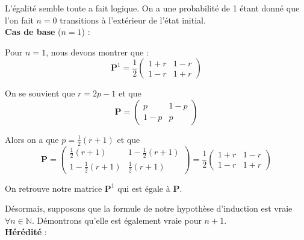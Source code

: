 \documentclass{article}
\begin{document}
    \newpage
    L'égalité semble toute a fait logique. On a une probabilité de 1 étant donné que l'on fait \(n = 0\) transitions à l'extérieur de l'état initial. \\

    \textbf{Cas de base} (\(n = 1\)) :

    \vspace{.1cm}
    Pour \(n = 1\), nous devons montrer que :
    \[
        \boldsymbol{P}^1 = \frac{1}{2} \begin{pmatrix}
            1 + r & 1 - r \\
            1 - r & 1 + r
        \end{pmatrix}
    \]

    On se souvient que \(r = 2p - 1\) et que
    \[
        \boldsymbol{P} = \begin{pmatrix}
            p & 1 - p \\
            1 - p & p
        \end{pmatrix}
    \]

    Alors on a que \(p = \frac{1}{2} (r + 1)\) et que
    \[
        \boldsymbol{P} = \begin{pmatrix}
        \frac{1}{2} (r + 1) & 1 - \frac{1}{2} (r + 1) \\
        1 - \frac{1}{2} (r + 1) & \frac{1}{2} (r + 1)
        \end{pmatrix}
        =
        \frac{1}{2} \begin{pmatrix} 1 + r & 1 - r \\ 1 - r & 1 + r \end{pmatrix}
    \]

    On retrouve notre matrice $\boldsymbol{P}^1$ qui est égale à $\boldsymbol{P}$.

    \vspace{.3cm}
    Désormais, supposons que la formule de notre hypothèse d'induction est vraie \(\forall n \in \mathbb{N}\). Démontrons qu'elle est également vraie pour \(n + 1\). \\

    \textbf{Hérédité} :
\end{document}
